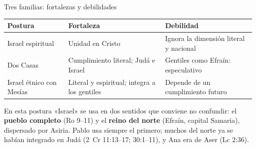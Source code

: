 \begin{frame}{Tres familias: fortalezas y debilidades}
\centering\small\renewcommand{\arraystretch}{1.35}
\begin{tabular}{>{\RaggedRight\arraybackslash}p{2.8cm}>{\RaggedRight\arraybackslash}p{4.0cm}>{\RaggedRight\arraybackslash}p{4.4cm}}
\toprule
\color{ladrillo}\bfseries Postura & \color{ladrillo}\bfseries Fortaleza & \color{ladrillo}\bfseries Debilidad\\\midrule
Israel espiritual & Unidad en Cristo & Ignora la dimensión literal y nacional\\
Dos Casas & Cumplimiento literal; Judá e Israel & Gentiles como Efraín: especulativo\\
Israel étnico con Mesías & Literal y espiritual; integra a los gentiles & Depende de un cumplimiento futuro\\
\bottomrule
\end{tabular}\par
\elabpropia\vspace{6pt}
\begin{notalam}
En esta postura «Israel» se usa en dos sentidos que conviene no confundir: el \textbf{pueblo completo} (Ro 9--11) y el \textbf{reino del norte} (Efraín, capital Samaria), dispersado por Asiria. Pablo usa siempre el primero; muchos del norte ya se habían integrado en Judá (2~Cr 11:13--17; 30:1--11), y Ana era de Aser (Lc 2:36).
\end{notalam}
\end{frame}

